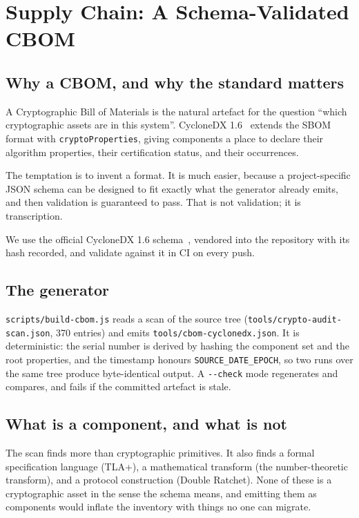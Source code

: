 \section{Supply Chain: A Schema-Validated CBOM}
\label{sec:cbom}

\subsection{Why a CBOM, and why the standard matters}

A Cryptographic Bill of Materials is the natural artefact for the question
``which cryptographic assets are in this system''. CycloneDX 1.6~\cite{cyclonedx16} extends the
SBOM format with \texttt{cryptoProperties}, giving components a place to declare
their algorithm properties, their certification status, and their occurrences.

The temptation is to invent a format. It is much easier, because a
project-specific JSON schema can be designed to fit exactly what the generator
already emits, and then validation is guaranteed to pass. That is not
validation; it is transcription.

We use the official CycloneDX 1.6 schema~\cite{cyclonedx-schema16}, vendored into
the repository with its hash recorded, and validate against it in CI on every push.

\subsection{The generator}

\texttt{scripts/build-cbom.js} reads a scan of the source tree
(\texttt{tools/crypto-audit-scan.json}, 370 entries) and emits
\texttt{tools/cbom-cyclonedx.json}. It is deterministic: the serial number is
derived by hashing the component set and the root properties, and the timestamp
honours \texttt{SOURCE\_DATE\_EPOCH}, so two runs over the same tree produce
byte-identical output. A \texttt{-{}-check} mode regenerates and compares, and
fails if the committed artefact is stale.

\subsection{What is a component, and what is not}

The scan finds more than cryptographic primitives. It also finds a formal
specification language (TLA+), a mathematical transform (the number-theoretic
transform), and a protocol construction (Double Ratchet). None of these is a
cryptographic asset in the sense the schema means, and emitting them as
components would inflate the inventory with things no one can migrate.

